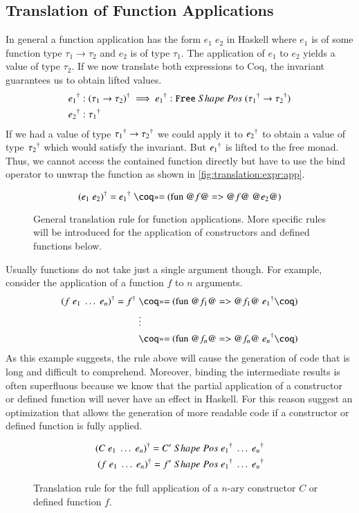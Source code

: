 \subsection{Translation of Function Applications} \label{sec:translation:expr:app}
In general a function application has the form $e_1\;e_2$ in Haskell where $e_1$ is of some function type $\tau_1 \rightarrow \tau_2$ and $e_2$ is of type $\tau_1$.
The application of $e_1$ to $e_2$ yields a value of type $\tau_2$.
If we now translate both expressions to Coq, the invariant guarantees us to obtain lifted values.
\begin{align*}
  {e_1}^{\dagger} &: {(\tau_1 \rightarrow \tau_2)}^{\dagger}
  \implies {e_1}^{\dagger} : {\texttt{Free}}\;Shape\;Pos\;{({\tau_1}^{\dagger} \rightarrow {\tau_2}^{\dagger})} \\
  {e_2}^{\dagger} &: {\tau_1}^{\dagger}
\end{align*}
If we had a value of type ${\tau_1}^{\dagger} \rightarrow {\tau_2}^{\dagger}$ we could apply it to ${e_2}^{\dagger}$ to obtain a value of type ${\tau_2}^{\dagger}$ which would satisfy the invariant.
But ${e_1}^{\dagger}$ is lifted to the free monad.
Thus, we cannot access the contained function directly but have to use the bind operator to unwrap the function as shown in \autoref{fig:translation:expr:app}.
\begin{figure}[H]
  \[
    \toCoq{(e_1\;e_2)} = \toCoq{e_1}\;\coqM{>>= (fun @$f$@ => @$f$@ @$e_2$@)}
  \]
  \caption{General translation rule for function applications. More specific rules will be introduced for the application of constructors and defined functions below.}
  \label{fig:translation:expr:app}
\end{figure}

Usually functions do not take just a single argument though.
For example, consider the application of a function $f$ to $n$ arguments.
\begin{align*}
  \toCoq{(f\;e_1\;\ldots\;e_n)}
    = \toCoq{f}\;&\coqM{>>= (fun @$f_1$@ => @$f_1$@}\;\toCoq{e_1}\coqM{)} \\
                 &\vdots                                                  \\
                 &\coqM{>>= (fun @$f_n$@ => @$f_n$@}\;\toCoq{e_n}\coqM{)}
\end{align*}
As this example suggests, the rule above will cause the generation of code that is long and difficult to comprehend.
Moreover, binding the intermediate results is often superfluous because we know that the partial application of a constructor or defined function will never have an effect in Haskell.
For this reason \cite{Abel:2005} suggest an optimization that allows the generation of more readable code if a constructor or defined function is fully applied.
\begin{figure}[H]
  \begin{align*}
    {(C\;e_1\;\ldots\;e_n)}^{\dagger} = C'\;Shape\;Pos\;{e_1}^{\dagger}\;\ldots\;{e_n}^{\dagger} \\
    {(f\;e_1\;\ldots\;e_n)}^{\dagger} = f'\;Shape\;Pos\;{e_1}^{\dagger}\;\ldots\;{e_n}^{\dagger}
  \end{align*}
  \caption{Translation rule for the full application of a $n$-ary constructor $C$ or defined function $f$.}
  \label{fig:translation:expr:fun_app}
\end{figure}

